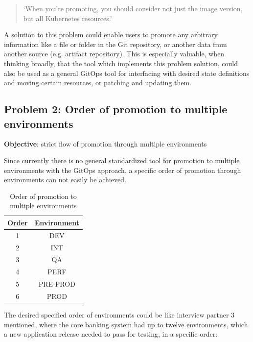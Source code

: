 \begin{quotation}
	\noindent
	\enquote*{When you're promoting, you should consider not just the image version, but all Kubernetes resources.}
\end{quotation}

A solution to this problem could enable users to promote any arbitrary information
like a file or folder in the Git repository,
or another data from another source (e.g. artifact repository).
This is especially valuable, when thinking broadly, that the tool
which implements this problem solution, could also be used as a general
GitOps tool for interfacing with desired state definitions and moving certain
resources, or patching and updating them.

\subsection{Problem 2: Order of promotion to multiple environments}

\textbf{Objective}: strict flow of promotion through multiple environments

Since currently there is no general standardized tool for promotion to multiple environments with the GitOps approach,
a specific order of promotion through environments can not easily be achieved.

\begin{table}[h]
	\begin{center}
		\begin{tabular}{||c c||} 
			\hline
			Order & Environment \\ [0.5ex] 
			\hline\hline
			1 & DEV \\ 
			\hline
			2 & INT \\ 
			\hline
			3 & QA \\
			\hline
			4 & PERF \\
			\hline
			5 & PRE-PROD \\
			\hline
			6 & PROD \\
			\hline
		\end{tabular}
		\caption{Order of promotion to multiple environments}
		\label{table:order-promotion-multi-env}
	\end{center}
\end{table}

The desired specified order of environments could be like interview partner 3 mentioned,
where the core banking system had up to twelve environments,
which a new application release needed to pass for testing,
in a specific order:

